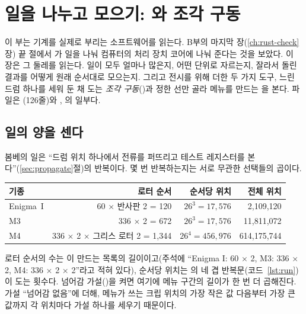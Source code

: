 \chapter{일을 나누고 모으기: \texorpdfstring{}{search}와 조각 구동}\label{ch:14-rust-search}
\begingroup\setlength{\emergencystretch}{3em}%

이 부는 기계를 실제로 부리는 소프트웨어를 읽는다. B부의 마지막 장(\ref{ch:rust-check}장) 끝 절에서
가 일을 나눠 컴퓨터의 처리 장치 코어에 나눠 준다는 것을 보았다. 이 장은 그 둘레를 읽는다. 일이 모두 얼마나 많은지, 어떤 단위로 자르는지, 잘라서 돌린 결과를 어떻게
원래 순서대로 모으는지. 그리고 전시를 위해 더한 두 가지 도구, 느린 드럼 하나를 세워 둔 채 도는 \emph{조각
구동}()과 정한 선만 골라 메뉴를 만드는 을 본다. 파일은
(126줄)와 , 의 일부다.

\section{일의 양을 센다}\label{sec:s-count}

봄베의 일은 ``드럼 위치 하나에서 전류를 퍼뜨리고 테스트 레지스터를 본다''(\ref{sec:propagate}절)의 반복이다.
몇 번 반복하는지는 서로 무관한 선택들의 곱이다.

\begin{center}
\small
\begin{tabular}{lrrr}
\toprule
기종 & 로터 순서 & 순서당 위치 & 전체 위치 \\
\midrule
Enigma~I & 60 $\times$ 반사판 2 = 120 & $26^3 = 17{,}576$ & 2,109,120 \\
M3 & 336 $\times$ 2 = 672 & $26^3 = 17{,}576$ & 11,811,072 \\
M4 & 336 $\times$ 2 $\times$ 그리스 로터 2 = 1,344 & $26^4 = 456{,}976$ & 614,175,744 \\
\bottomrule
\end{tabular}
\end{center}

로터 순서의 수는 이 만드는 목록의 길이이고(주석에 ``Enigma I: 60 × 2, M3: 336 × 2,
M4: 336 × 2 × 2''라고 적혀 있다), 순서당 위치는 의 네 겹 반복문(코드~\ref{lst:run})이 도는
횟수다. 넘어감 가설()을 켜면 여기에 메뉴 구간의 길이가 한 번 더 곱해진다. 가설
``넘어감 없음''에 더해, 메뉴가 쓰는 크립 위치의 가장 작은 값 다음부터 가장 큰 값까지 각 위치마다 가설 하나를
세우기 때문이다.

